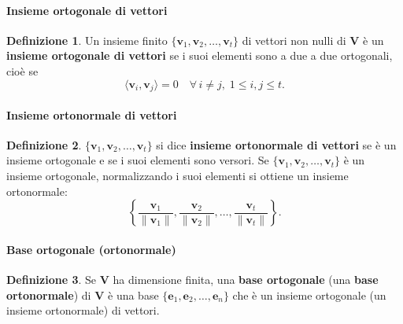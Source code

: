 \documentclass{article}
\theoremstyle{plain}
\theoremstyle{definition}
\newtheorem{defn}{Definizione}[section]
\theoremstyle{remark}
\begin{document}
\vspace{10pt}

\paragraph{Insieme ortogonale di vettori}
\begin{bxthm}
\begin{defn}
Un insieme finito $\{ \mathbf{v}_1, \mathbf{v}_2, \ldots, \mathbf{v}_t \}$ di vettori non nulli di $\mathbf{V}$ 
è un \textbf{insieme ortogonale di vettori} se i suoi elementi sono a due a due ortogonali, cioè se 
\[
\langle \mathbf{v}_i, \mathbf{v}_j \rangle = 0 \quad \forall\, i \neq j, \; 1 \leq i, j \leq t.
\]    
\end{defn}
\end{bxthm}

\vspace{10pt}

\paragraph{Insieme ortonormale di vettori}
\begin{bxthm}
\begin{defn}
$\{ \mathbf{v}_1, \mathbf{v}_2, \ldots, \mathbf{v}_t \}$ si dice \textbf{insieme ortonormale di vettori} se è un 
insieme ortogonale e se i suoi elementi sono versori. Se $\{ \mathbf{v}_1, \mathbf{v}_2, \ldots, \mathbf{v}_t \}$ 
è un insieme ortogonale, normalizzando i suoi elementi si ottiene un insieme ortonormale:
\[
\left\{ \frac{\mathbf{v}_1}{\| \mathbf{v}_1 \|}, \frac{\mathbf{v}_2}{\| \mathbf{v}_2 \|}, \ldots, \frac{\mathbf{v}_t}{\| \mathbf{v}_t \|} \right\}.
\]
\end{defn}
\end{bxthm}

\vspace{10pt}

\vspace{10pt}

\paragraph{Base ortogonale (ortonormale)}
\begin{bxthm}
\begin{defn}
Se $\mathbf{V}$ ha dimensione finita, una \textbf{base ortogonale} (una \textbf{base ortonormale}) di $\mathbf{V}$ 
è una base $\{ \mathbf{e}_1, \mathbf{e}_2, \ldots, \mathbf{e}_n \}$ che è un insieme ortogonale (un insieme ortonormale) di vettori.
\end{defn}
\end{bxthm}
\end{document}

